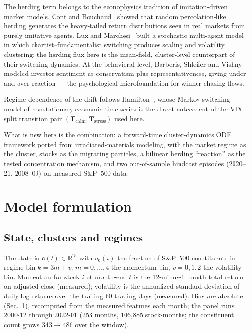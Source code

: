 \documentclass[11pt,a4paper]{article}
\begin{document}
The herding term belongs to the econophysics tradition of imitation-driven
market models.  Cont and Bouchaud~\cite{cont2000} showed that random
percolation-like herding generates the heavy-tailed return distributions seen
in real markets from purely imitative agents.  Lux and
Marchesi~\cite{lux1999} built a stochastic multi-agent model in which
chartist--fundamentalist switching produces scaling and volatility
clustering; the herding flux here is the mean-field, cluster-level
counterpart of their switching dynamics.  At the behavioral level, Barberis,
Shleifer and Vishny~\cite{barberis1998} modeled investor sentiment as
conservatism plus representativeness, giving under- and over-reaction ---
the psychological microfoundation for winner-chasing flows.

Regime dependence of the drift follows Hamilton~\cite{hamilton1989}, whose
Markov-switching model of nonstationary economic time series is the direct
antecedent of the VIX-split transition pair
$(\mathbf{T}_{\mathrm{calm}},\mathbf{T}_{\mathrm{stress}})$ used here.

What is new here is the combination: a forward-time cluster-dynamics ODE
framework ported from irradiated-materials modeling, with the market regime
as the cluster, stocks as the migrating particles, a bilinear herding
``reaction'' as the tested concentration mechanism, and two out-of-sample
hindcast episodes (2020--21, 2008--09) on measured S\&P~500 data.

\section{Model formulation}
\subsection{State, clusters and regimes}
The state is $\mathbf{c}(t)\in\mathbb{R}^{15}$ with
$c_{k}(t)$ the fraction of S\&P~500 constituents in regime bin
$k=3m+v$, $m=0,\dots,4$ the momentum bin, $v=0,1,2$ the volatility bin.
Momentum for stock $i$ at month-end $t$ is the 12-minus-1 month total return
on adjusted close (measured); volatility is the annualized standard
deviation of daily log returns over the trailing 60 trading days (measured).
Bins are absolute (Sec.~1), recomputed from the measured features each
month; the panel runs 2000-12 through 2022-01 (253 months, 106{,}885
stock-months; the constituent count grows 343$\to$486 over the window).
\end{document}
